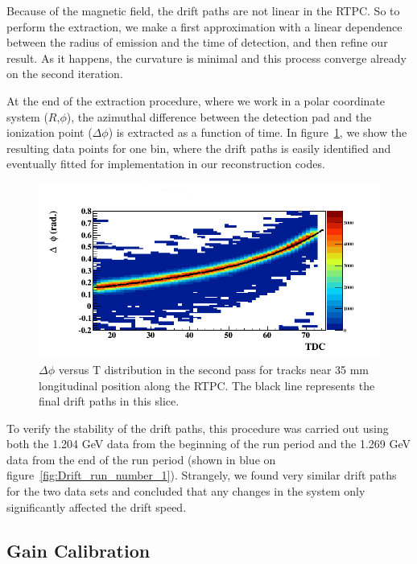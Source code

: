 \documentclass[twocolumn,showpacs,superscriptaddress,groupedaddress]{revtex4}
\begin{document}
Because of the 
magnetic field, the drift paths are not linear in the RTPC. So to perform the extraction, 
we make a first approximation with a linear dependence between the radius of 
emission and the time of detection, and then refine our result. As it happens, 
the curvature is minimal and this process converge already on the second 
iteration. 

At the end of the extraction procedure, where we work in a polar coordinate 
system ($R$,$\phi$), the azimuthal difference between the detection pad and 
the ionization point ($\Delta\phi$) is extracted as a function of time. 
In figure~\ref{fig:DELTA_PHI_TDC}, we show the resulting data points for one 
bin, where the drift paths is easily identified and eventually fitted for 
implementation in our reconstruction codes.

\begin{figure}[tb]
\centering
\includegraphics[scale=0.37]{fig/FitResult_p2_10.png}
\caption{$\Delta \phi$ versus T distribution in the second pass for tracks
near 35 mm longitudinal position along the RTPC. The black line represents 
the final drift paths in this slice.}
\label{fig:DELTA_PHI_TDC}
\end{figure}

To verify the stability of the drift paths, this procedure was carried out 
using both the 1.204 GeV data from the beginning of the run period and the 
1.269 GeV data from the end of the run period (shown in blue on 
figure~\ref{fig:Drift_run_number_1}). Strangely, we found very similar drift paths
for the two data sets and concluded that any changes in the system only
significantly affected the drift speed.

\subsection{Gain Calibration}
\end{document}
